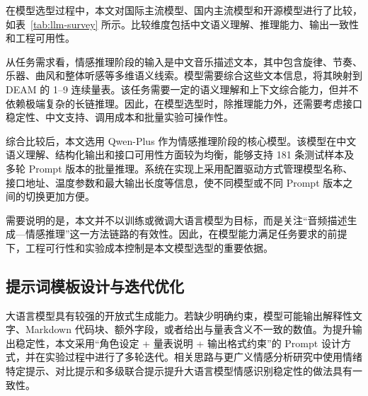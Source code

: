 在模型选型过程中，本文对国际主流模型、国内主流模型和开源模型进行了比较，如表~\ref{tab:llm-survey} 所示。比较维度包括中文语义理解、推理能力、输出一致性和工程可用性。

\begin{table}[htbp]
  \centering
  \caption{情感推理阶段大语言模型调研对比}
  \label{tab:llm-survey}
\end{table}

从任务需求看，情感推理阶段的输入是中文音乐描述文本，其中包含旋律、节奏、乐器、曲风和整体听感等多维语义线索。模型需要综合这些文本信息，将其映射到 DEAM 的 1--9 连续量表。该任务需要一定的语义理解和上下文综合能力，但并不依赖极端复杂的长链推理。因此，在模型选型时，除推理能力外，还需要考虑接口稳定性、中文支持、调用成本和批量实验可操作性。

综合比较后，本文选用 Qwen-Plus\cite{yang2024qwen2} 作为情感推理阶段的核心模型。该模型在中文语义理解、结构化输出和接口可用性方面较为均衡，能够支持 181 条测试样本及多轮 Prompt 版本的批量推理。系统在实现上采用配置驱动方式管理模型名称、接口地址、温度参数和最大输出长度等信息，使不同模型或不同 Prompt 版本之间的切换更加方便。

需要说明的是，本文并不以训练或微调大语言模型为目标，而是关注“音频描述生成—情感推理”这一方法链路的有效性。因此，在模型能力满足任务要求的前提下，工程可行性和实验成本控制是本文模型选型的重要依据。

\subsection{提示词模板设计与迭代优化}

大语言模型具有较强的开放式生成能力。若缺少明确约束，模型可能输出解释性文字、Markdown 代码块、额外字段，或者给出与量表含义不一致的数值。为提升输出稳定性，本文采用“角色设定 + 量表说明 + 输出格式约束”的 Prompt 设计方式，并在实验过程中进行了多轮迭代。相关思路与更广义情感分析研究中使用情绪特定提示、对比提示和多级联合提示提升大语言模型情感识别稳定性的做法具有一致性\cite{li2025revise,yan2023contrastive,zhang2024threelevel}。

